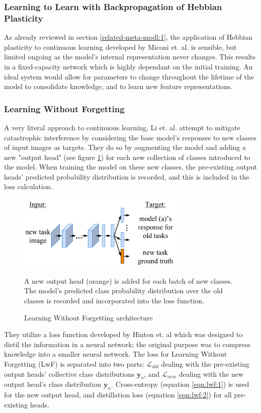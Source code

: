 \documentclass{report}
\begin{document}
\subsubsection{Learning to Learn with Backpropagation of Hebbian Plasticity}
As already reviewed in section \ref{related-meta-modl:1}, the application of Hebbian plasticity to continuous learning developed by Miconi et. al. \parencite{ltlwbohb} is sensible, but limited ongoing as the model's internal representation never changes. This results in a fixed-capacity network which is highly dependant on the initial training. An ideal system would allow for parameters to change throughout the lifetime of the model to consolidate knowledge, and to learn new feature representations.

\subsubsection{Learning Without Forgetting}
A very literal approach to continuous learning, Li et. al. \parencite{lwf} attempt to mitigate catastrophic interference by considering the base model's responses to new classes of input images as targets. They do so by augmenting the model and adding a new "output head" (see figure \ref{fig:lwf:1}) for each new collection of classes introduced to the model. When training the model on these new classes, the pre-existing output heads' predicted probability distribution is recorded, and this is included in the loss calculation. \newline
\begin{figure}[h]
 \centering
 \includegraphics[width=8cm]{lwfarchitecture}
 \caption{Learning Without Forgetting architecture}
 A new output head (orange) is added for each batch of new classes. The model's predicted class probability distribution over the old classes is recorded and incorporated into the loss function.
 \label{fig:lwf:1}
\end{figure}
They utilize a loss function developed by Hinton et. al \parencite{distillation} which was designed to distil the information in a neural network; the original purpose was to compress knowledge into a smaller neural network. The loss for Learning Without Forgetting (LwF) is separated into two parts: $\mathcal{L}_{old}$ dealing with the pre-existing output heads' collective class distributions $\bm{y}_o$, and $\mathcal{L}_{new}$ dealing with the new output head's class distribution $\bm{y}_n$. Cross-entropy (equation \ref{eqn:lwf:1}) is used for the new output head, and distillation loss (equation \ref{eqn:lwf:2}) for all pre-existing heads. \par
\end{document}
